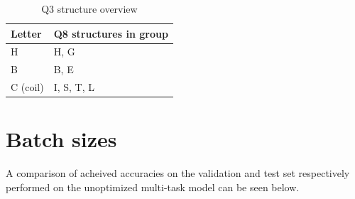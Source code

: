 \begin{table}
\caption{Q3 structure overview}
\centering
\begin{tabular}{l|l}
\hline
Letter		& Q8 structures in group	\\ \hline
H			& H, G						\\
B			& B, E						\\
C (coil)	& I, S, T, L				\\

\end{tabular}
\end{table}

\section*{Batch sizes}
A comparison of acheived accuracies on the validation and test set respectively performed on the unoptimized multi-task model can be seen below.

